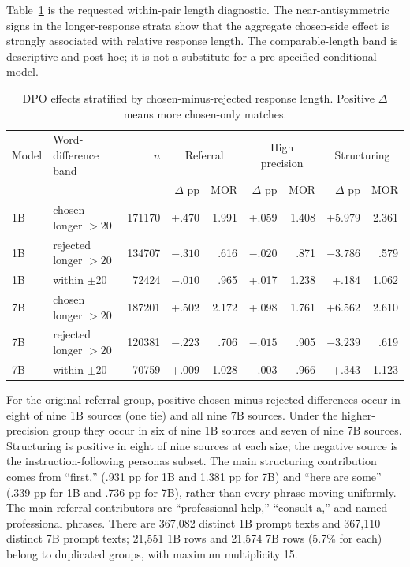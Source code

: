 \documentclass[11pt]{article}
\begin{document}
Table~\ref{tab:dpo-length} is the requested within-pair length diagnostic. The
near-antisymmetric signs in the longer-response strata show that the aggregate
chosen-side effect is strongly associated with relative response length. The
comparable-length band is descriptive and post hoc; it is not a substitute for
a pre-specified conditional model.

\begin{table}[h]
\centering
\footnotesize
\setlength{\tabcolsep}{3pt}
\begin{tabular}{llrrrrrrr}
\toprule
Model & Word-difference band & $n$ & \multicolumn{2}{c}{Referral} &
\multicolumn{2}{c}{High precision} & \multicolumn{2}{c}{Structuring} \\
 & & & $\Delta$ pp & MOR & $\Delta$ pp & MOR & $\Delta$ pp & MOR \\
\midrule
1B & chosen longer $>20$ & 171170 & +.470 & 1.991 & +.059 & 1.408 & +5.979 & 2.361 \\
1B & rejected longer $>20$ & 134707 & $-.310$ & .616 & $-.020$ & .871 & $-3.786$ & .579 \\
1B & within $\pm20$ & 72424 & $-.010$ & .965 & +.017 & 1.238 & +.184 & 1.062 \\
\midrule
7B & chosen longer $>20$ & 187201 & +.502 & 2.172 & +.098 & 1.761 & +6.562 & 2.610 \\
7B & rejected longer $>20$ & 120381 & $-.223$ & .706 & $-.015$ & .905 & $-3.239$ & .619 \\
7B & within $\pm20$ & 70759 & +.009 & 1.028 & $-.003$ & .966 & +.343 & 1.123 \\
\bottomrule
\end{tabular}
\caption{DPO effects stratified by chosen-minus-rejected response length.
Positive $\Delta$ means more chosen-only matches.}
\label{tab:dpo-length}
\end{table}

For the original referral group, positive chosen-minus-rejected differences
occur in eight of nine 1B sources (one tie) and all nine 7B sources. Under the
higher-precision group they occur in six of nine 1B sources and seven of nine
7B sources. Structuring is positive in eight of nine sources at each size; the
negative source is the instruction-following personas subset. The main
structuring contribution comes from ``first,'' (.931 pp for 1B and 1.381 pp for
7B) and ``here are some'' (.339 pp for 1B and .736 pp for 7B), rather than every
phrase moving uniformly. The main referral contributors are ``professional
help,'' ``consult a,'' and named professional phrases. There are 367{,}082
distinct 1B prompt texts and 367{,}110 distinct 7B prompt texts; 21{,}551 1B
rows and 21{,}574 7B rows (5.7\% for each) belong to duplicated groups, with maximum
multiplicity 15.
\end{document}
